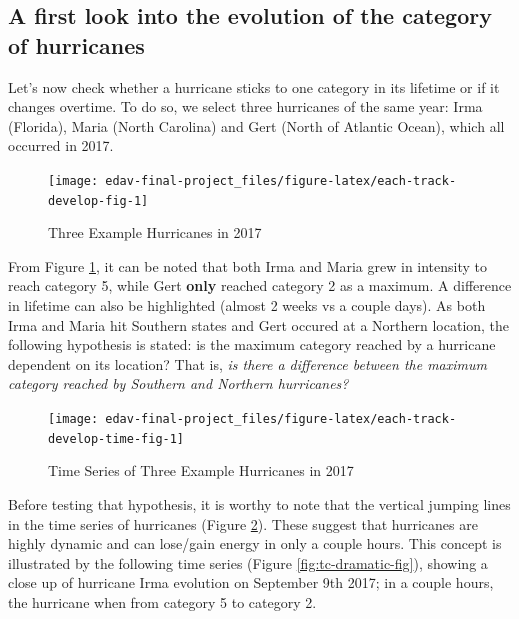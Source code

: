 \documentclass[]{book}
\begin{document}
\hypertarget{a-first-look-into-the-evolution-of-the-category-of-hurricanes}{%
\subsection{A first look into the evolution of the category of hurricanes}\label{a-first-look-into-the-evolution-of-the-category-of-hurricanes}}

Let's now check whether a hurricane sticks to one category in its lifetime or if it changes overtime. To do so, we select three hurricanes of the same year: Irma (Florida), Maria (North Carolina) and Gert (North of Atlantic Ocean), which all occurred in 2017.

\begin{figure}

{\centering \texttt{[image: edav-final-project\_files/figure-latex/each-track-develop-fig-1]} 

}

\caption{Three Example Hurricanes in 2017}\label{fig:each-track-develop-fig}
\end{figure}

From Figure \ref{fig:each-track-develop-fig}, it can be noted that both Irma and Maria grew in intensity to reach category 5, while Gert \textbf{only} reached category 2 as a maximum. A difference in lifetime can also be highlighted (almost 2 weeks vs a couple days). As both Irma and Maria hit Southern states and Gert occured at a Northern location, the following hypothesis is stated: is the maximum category reached by a hurricane dependent on its location? That is, \emph{is there a difference between the maximum category reached by Southern and Northern hurricanes?}

\begin{figure}

{\centering \texttt{[image: edav-final-project\_files/figure-latex/each-track-develop-time-fig-1]} 

}

\caption{Time Series of Three Example Hurricanes in 2017}\label{fig:each-track-develop-time-fig}
\end{figure}

Before testing that hypothesis, it is worthy to note that the vertical jumping lines in the time series of hurricanes (Figure \ref{fig:each-track-develop-time-fig}). These suggest that hurricanes are highly dynamic and can lose/gain energy in only a couple hours. This concept is illustrated by the following time series (Figure \ref{fig:tc-dramatic-fig}), showing a close up of hurricane Irma evolution on September 9th 2017; in a couple hours, the hurricane when from category 5 to category 2.
\end{document}
